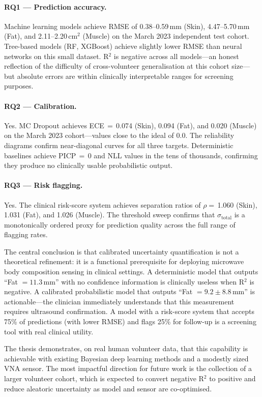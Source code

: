 \documentclass[12pt, a4paper, oneside]{report}
\begin{document}
\paragraph{RQ1 — Prediction accuracy.} Machine learning models achieve RMSE of 0.38--0.59\,mm (Skin), 4.47--5.70\,mm (Fat), and 2.11--2.20\,cm$^2$ (Muscle) on the March 2023 independent test cohort. Tree-based models (RF, XGBoost) achieve slightly lower RMSE than neural networks on this small dataset. R$^2$ is negative across all models---an honest reflection of the difficulty of cross-volunteer generalisation at this cohort size---but absolute errors are within clinically interpretable ranges for screening purposes.

\paragraph{RQ2 — Calibration.} Yes. MC Dropout achieves ECE\,$=$\,0.074 (Skin), 0.094 (Fat), and 0.020 (Muscle) on the March 2023 cohort---values close to the ideal of 0.0. The reliability diagrams confirm near-diagonal curves for all three targets. Deterministic baselines achieve PICP\,$=$\,0 and NLL values in the tens of thousands, confirming they produce no clinically usable probabilistic output.

\paragraph{RQ3 — Risk flagging.} Yes. The clinical risk-score system achieves separation ratios of $\rho =$\,1.060 (Skin), 1.031 (Fat), and 1.026 (Muscle). The threshold sweep confirms that $\sigma_{\mathrm{total}}$ is a monotonically ordered proxy for prediction quality across the full range of flagging rates.

The central conclusion is that calibrated uncertainty quantification is not a theoretical refinement: it is a functional prerequisite for deploying microwave body composition sensing in clinical settings. A deterministic model that outputs ``Fat $= 11.3$\,mm'' with no confidence information is clinically useless when R$^2$ is negative. A calibrated probabilistic model that outputs ``Fat $= 9.2 \pm 8.8$\,mm'' is actionable---the clinician immediately understands that this measurement requires ultrasound confirmation. A model with a risk-score system that accepts 75\% of predictions (with lower RMSE) and flags 25\% for follow-up is a screening tool with real clinical utility.

The thesis demonstrates, on real human volunteer data, that this capability is achievable with existing Bayesian deep learning methods and a modestly sized VNA sensor. The most impactful direction for future work is the collection of a larger volunteer cohort, which is expected to convert negative R$^2$ to positive and reduce aleatoric uncertainty as model and sensor are co-optimised.
\end{document}
